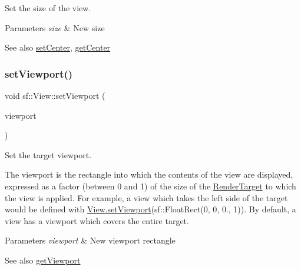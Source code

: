 Set the size of the view. 


\begin{DoxyParams}{Parameters}
{\em size} & New size\\
\hline
\end{DoxyParams}
\begin{DoxySeeAlso}{See also}
\hyperlink{classsf_1_1_view_aa8e3fedb008306ff9811163545fb75f2}{set\+Center}, \hyperlink{classsf_1_1_view_a7f4443c194c691ae4dcf8fd9dd0eaa46}{get\+Center} 
\end{DoxySeeAlso}
\mbox{\label{classsf_1_1_view_a8eaec46b7d332fe834f016d0187d4b4a}} 
\subsubsection{\texorpdfstring{set\+Viewport()}{setViewport()}}
{\footnotesize\ttfamily void sf\+::\+View\+::set\+Viewport (\begin{DoxyParamCaption}\item[{const \hyperlink{classsf_1_1_rect}{Float\+Rect} \&}]{viewport }\end{DoxyParamCaption})}



Set the target viewport. 

The viewport is the rectangle into which the contents of the view are displayed, expressed as a factor (between 0 and 1) of the size of the \hyperlink{classsf_1_1_render_target}{Render\+Target} to which the view is applied. For example, a view which takes the left side of the target would be defined with \hyperlink{classsf_1_1_view_a8eaec46b7d332fe834f016d0187d4b4a}{View.\+set\+Viewport}(sf\+::\+Float\+Rect(0, 0, 0., 1)). By default, a view has a viewport which covers the entire target.


\begin{DoxyParams}{Parameters}
{\em viewport} & New viewport rectangle\\
\hline
\end{DoxyParams}
\begin{DoxySeeAlso}{See also}
\hyperlink{classsf_1_1_view_a93859b4e2e8c191ec741731211a0fb12}{get\+Viewport} 
\end{DoxySeeAlso}
\mbox{\label{classsf_1_1_view_a4a72a360a5792fbe4e99cd6feaf7726e}} 
